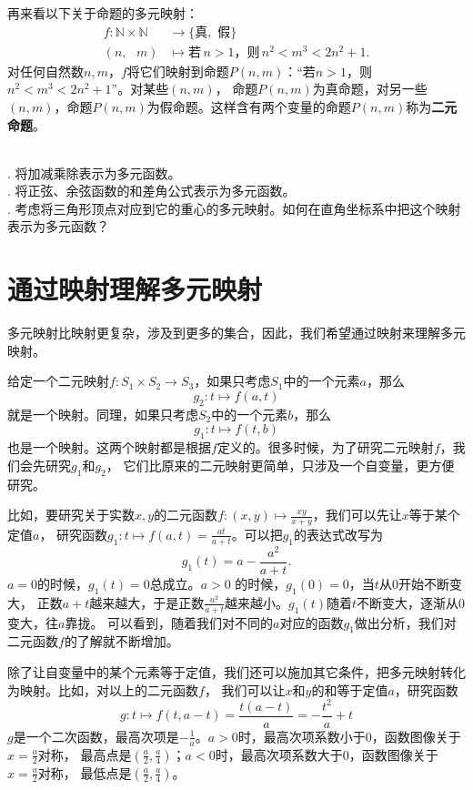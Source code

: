 \documentclass[12pt,UTF8]{ctexbook}
\begin{document}
再来看以下关于命题的多元映射：
\begin{align*}
    f: \mathbb{N} \times \mathbb{N} \,\, &\rightarrow \{\mbox{真}, \,\, \mbox{假}\}  \\
    (n, \,\,\,\, m) &\mapsto \mbox{若}\, n > 1 \mbox{，则}\, n^2 < m^3 < 2n^2 + 1.  
\end{align*}
对任何自然数$n,m$，$f$将它们映射到命题$P(n,m)$：“若$n > 1$，则$n^2 < m^3 < 2n^2 + 1$”。对某些$(n,m)$，
命题$P(n,m)$为真命题，对另一些$(n,m)$，命题$P(n,m)$为假命题。这样含有两个变量的命题$P(n,m)$称为\textbf{二元命题}。

\begin{xt}
    \mbox{} \\
    . 将加减乘除表示为多元函数。\\
    . 将正弦、余弦函数的和差角公式表示为多元函数。\\
    . 考虑将三角形顶点对应到它的重心的多元映射。如何在直角坐标系中把这个映射表示为多元函数？
\end{xt}

\section{通过映射理解多元映射}

多元映射比映射更复杂，涉及到更多的集合，因此，我们希望通过映射来理解多元映射。

给定一个二元映射$f:S_1 \times S_2 \rightarrow S_3$，如果只考虑$S_1$中的一个元素$a$，那么
$$ g_2: t \mapsto f(a, t)$$
就是一个映射。同理，如果只考虑$S_2$中的一个元素$b$，那么
$$g_1 : t \mapsto f(t, b)$$
也是一个映射。这两个映射都是根据$f$定义的。很多时候，为了研究二元映射$f$，我们会先研究$g_1$和$g_2$，
它们比原来的二元映射更简单，只涉及一个自变量，更方便研究。

比如，要研究关于实数$x, y$的二元函数$f: (x, y) \mapsto \frac{xy}{x + y}$，我们可以先让$x$等于某个定值$a$，
研究函数$g_1 : t \mapsto f(a, t) = \frac{at}{a + t}$。可以把$g_1$的表达式改写为
$$ g_1(t) = a - \frac{a^2}{a + t}.$$
$a = 0$的时候，$g_1(t) = 0$总成立。$a > 0$ 的时候，$g_1(0) = 0$，当$t$从$0$开始不断变大，
正数$a + t$越来越大，于是正数$\frac{a^2}{a + t}$越来越小。$g_1(t)$随着$t$不断变大，逐渐从$0$变大，往$a$靠拢。
可以看到，随着我们对不同的$a$对应的函数$g_1$做出分析，我们对二元函数$f$的了解就不断增加。

除了让自变量中的某个元素等于定值，我们还可以施加其它条件，把多元映射转化为映射。比如，对以上的二元函数$f$，
我们可以让$x$和$y$的和等于定值$a$，研究函数
$$ g : t \mapsto f(t, a - t) = \frac{t(a - t)}{a} = -\frac{t^2}{a} + t$$
$g$是一个二次函数，最高次项是$-\frac{1}{a}$。$a>0$时，最高次项系数小于$0$，函数图像关于$x = \frac{a}{2}$对称，
最高点是$(\frac{a}{2}, \frac{a}{4})$；$a<0$时，最高次项系数大于$0$，函数图像关于$x = \frac{a}{2}$对称，
最低点是$(\frac{a}{2}, \frac{a}{4})$。
\end{document}
